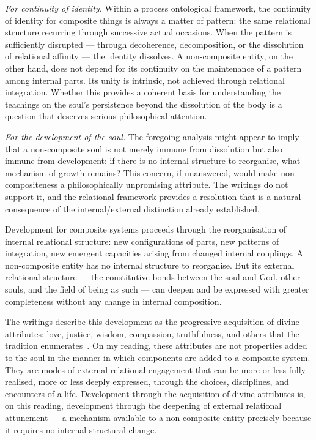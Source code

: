 \emph{For continuity of identity.}
Within a process ontological framework, the continuity of identity for
composite things is always a matter of pattern: the same relational
structure recurring through successive actual occasions.
When the pattern is sufficiently disrupted --- through decoherence, decomposition,
or the dissolution of relational affinity --- the identity dissolves.
A non-composite entity, on the other hand, does not depend for its continuity
on the maintenance of a pattern among internal parts.
Its unity is intrinsic, not achieved through relational integration.
Whether this provides a coherent basis for understanding the \bahai teachings
on the soul's persistence beyond the dissolution of the body is a question
that deserves serious philosophical attention.

\emph{For the development of the soul.}
The foregoing analysis might appear to imply that a non-composite soul is not
merely immune from dissolution but also immune from development: if there is no
internal structure to reorganise, what mechanism of growth remains?
This concern, if unanswered, would make non-compositeness a philosophically
unpromising attribute.
The \bahai writings do not support it, and the relational framework provides
a resolution that is a natural consequence of the internal/external distinction
already established.

Development for composite systems proceeds through the reorganisation of
internal relational structure: new configurations of parts, new patterns of
integration, new emergent capacities arising from changed internal couplings.
A non-composite entity has no internal structure to reorganise.
But its external relational structure --- the constitutive bonds between the
soul and God, other souls, and the field of being as such --- can deepen and
be expressed with greater completeness without any change in internal composition.

The \bahai writings describe this development as the progressive acquisition of
divine attributes: love, justice, wisdom, compassion, truthfulness, and others
that the tradition enumerates~\citep{HiddenWords}.
On my reading, these attributes are not properties added to the soul in the
manner in which components are added to a composite system.
They are modes of external relational engagement that can be more or less
fully realised, more or less deeply expressed, through the choices,
disciplines, and encounters of a life.
Development through the acquisition of divine attributes is, on this reading,
development through the deepening of external relational attunement --- a
mechanism available to a non-composite entity precisely because it requires
no internal structural change.

